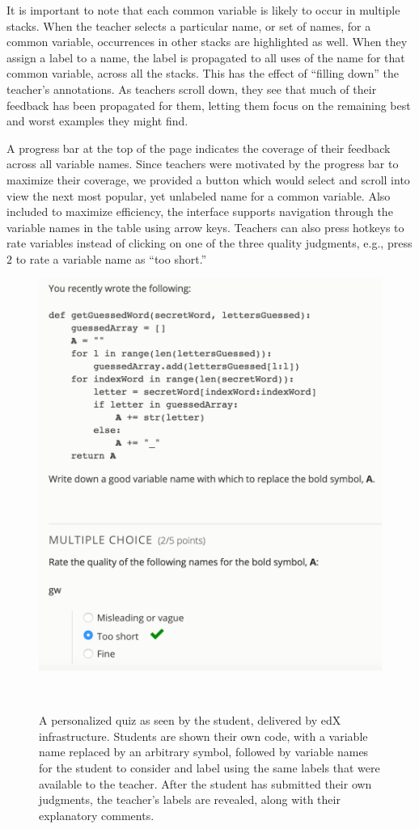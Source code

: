 It is important to note that each common variable is likely to occur in multiple stacks. When the teacher selects a particular name, or set of names, for a common variable, occurrences in other stacks are highlighted as well. When they assign a label to a name, the label is propagated to all uses of the name for that common variable, across all the stacks. This has the effect of ``filling down'' the teacher's annotations. As teachers scroll down, they see that much of their feedback has been propagated for them, letting them focus on the remaining best and worst examples they might find. 

A progress bar at the top of the page indicates the coverage of their feedback across all variable names. Since teachers were motivated by the progress bar to maximize their coverage, we provided a button which would select and scroll into view the next most popular, yet unlabeled name for a common variable. Also included to maximize efficiency, the interface supports navigation through the variable names in the table using arrow keys. Teachers can also press hotkeys to rate variables instead of clicking on one of the three quality judgments, e.g., press $2$ to rate a variable name as ``too short.''

\begin{figure}
\centering
\includegraphics[width=0.95\columnwidth]{Body/figures/foobaz/feedbackQuizExample.png}
\caption{A personalized quiz as seen by the student, delivered by edX infrastructure. Students are shown their own code, with a variable name replaced by an arbitrary symbol, followed by variable names for the student to consider and label using the same labels that were available to the teacher. After the student has submitted their own judgments, the teacher's labels are revealed, along with their explanatory comments.}~\label{fig:figure4}
\end{figure}

